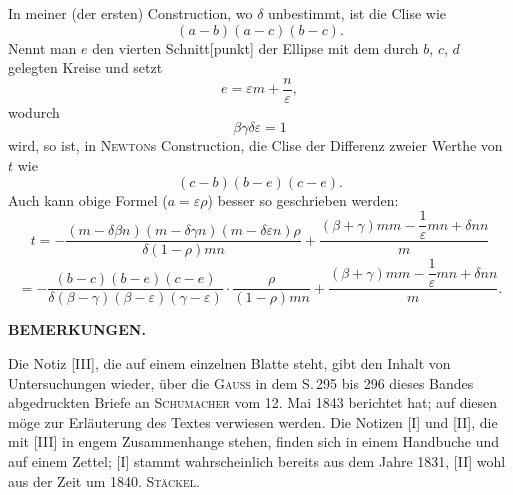 In meiner (der ersten) Construction, wo $\delta$ unbestimmt, ist die Clise wie
\[
(a-b)(a-c)(b-c).
\]
Nennt man $e$ den vierten Schnitt[punkt] der Ellipse mit dem durch $b$, $c$, $d$ gelegten Kreise und setzt
\[
e = \varepsilon m + \frac{n}{\varepsilon},
\]
wodurch
\[
\beta\gamma\delta\varepsilon = 1
\]
wird, so ist, in \textsc{Newton}s Construction, die Clise der Differenz zweier Werthe von $t$ wie
\[
(c-b)(b-e)(c-e).
\]
Auch kann obige Formel ($a=\varepsilon\rho$) besser so geschrieben werden:
\[
t = -\frac{(m-\delta\beta n)(m-\delta\gamma n)(m-\delta\varepsilon n)\rho}{\delta(1-\rho)mn} + \frac{(\beta+\gamma)mm-\dfrac{1}{\varepsilon}mn+\delta nn}{m}
\]
\[
= -\frac{(b-c)(b-e)(c-e)}{\delta(\beta-\gamma)(\beta-\varepsilon)(\gamma-\varepsilon)}\cdot\frac{\rho}{(1-\rho)mn} + \frac{(\beta+\gamma)mm-\dfrac{1}{\varepsilon}mn+\delta nn}{m}.
\]

\begin{center}\textbf{BEMERKUNGEN.}\end{center}

Die Notiz [III], die auf einem einzelnen Blatte steht, gibt den Inhalt von Untersuchungen wieder, über die \textsc{Gauss} in dem S.\,295 bis 296 dieses Bandes abgedruckten Briefe an \textsc{Schumacher} vom 12. Mai 1843 berichtet hat; auf diesen möge zur Erläuterung des Textes verwiesen werden. Die Notizen [I] und [II], die mit [III] in engem Zusammenhange stehen, finden sich in einem Handbuche und auf einem Zettel; [I] stammt wahrscheinlich bereits aus dem Jahre 1831, [II] wohl aus der Zeit um 1840.
\hfill \textsc{Stäckel}.
